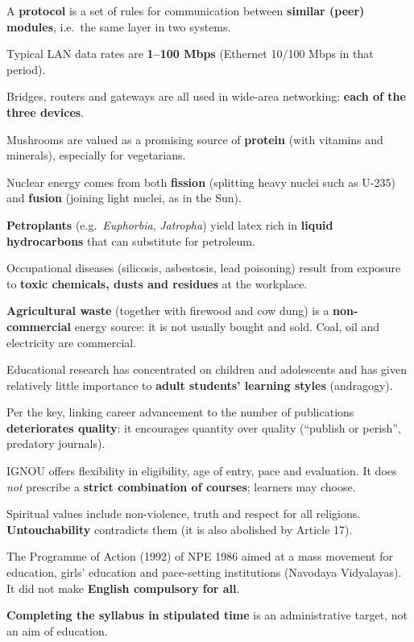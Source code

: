 A \textbf{protocol} is a set of rules for communication between \textbf{similar (peer) modules}, i.e.\ the same layer in two systems.

Typical LAN data rates are \textbf{1--100 Mbps} (Ethernet 10/100 Mbps in that period).

Bridges, routers and gateways are all used in wide-area networking: \textbf{each of the three devices}.

Mushrooms are valued as a promising source of \textbf{protein} (with vitamins and minerals), especially for vegetarians.

Nuclear energy comes from both \textbf{fission} (splitting heavy nuclei such as U-235) and \textbf{fusion} (joining light nuclei, as in the Sun).

\textbf{Petroplants} (e.g.\ \emph{Euphorbia}, \emph{Jatropha}) yield latex rich in \textbf{liquid hydrocarbons} that can substitute for petroleum.

Occupational diseases (silicosis, asbestosis, lead poisoning) result from exposure to \textbf{toxic chemicals, dusts and residues} at the workplace.

\textbf{Agricultural waste} (together with firewood and cow dung) is a \textbf{non-commercial} energy source: it is not usually bought and sold. Coal, oil and electricity are commercial.

Educational research has concentrated on children and adolescents and has given relatively little importance to \textbf{adult students' learning styles} (andragogy).

Per the key, linking career advancement to the number of publications \textbf{deteriorates quality}: it encourages quantity over quality (``publish or perish'', predatory journals).

IGNOU offers flexibility in eligibility, age of entry, pace and evaluation. It does \emph{not} prescribe a \textbf{strict combination of courses}; learners may choose.

Spiritual values include non-violence, truth and respect for all religions. \textbf{Untouchability} contradicts them (it is also abolished by Article 17).

The Programme of Action (1992) of NPE 1986 aimed at a mass movement for education, girls' education and pace-setting institutions (Navodaya Vidyalayas). It did not make \textbf{English compulsory for all}.

\textbf{Completing the syllabus in stipulated time} is an administrative target, not an aim of education.

